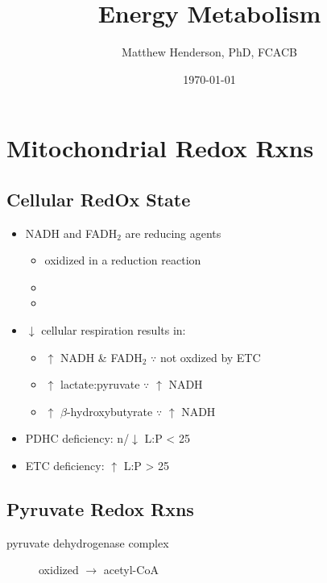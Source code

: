 \documentclass{scrartcl}
\author{Matthew Henderson, PhD, FCACB}
\date{\today}
\title{Energy Metabolism}
\begin{document}
\maketitle
\tableofcontents


\section{Mitochondrial Redox Rxns}
\label{sec:org5dca793}
\subsection{Cellular RedOx State}
\label{sec:org31262b0}
\begin{itemize}
\item NADH and FADH\(_{\text{2}}\) are reducing agents
\begin{itemize}
\item oxidized in a reduction reaction
\item {}
\item {}
\end{itemize}
\item \(\downarrow\) cellular respiration results in:
\begin{itemize}
\item \(\uparrow\) NADH \& FADH\(_{\text{2}}\) \(\because\) not oxdized by ETC
\item \(\uparrow\) lactate:pyruvate \(\because\) \(\uparrow\) NADH
\item \(\uparrow\) \(\beta\)-hydroxybutyrate  \(\because\) \(\uparrow\) NADH
\end{itemize}

\item PDHC deficiency: n/\(\downarrow\) L:P < 25
\item ETC deficiency: \(\uparrow\) L:P > 25
\end{itemize}

\subsection{Pyruvate Redox Rxns}
\label{sec:org52d4d7e}
\begin{description}
\item[{pyruvate dehydrogenase complex}] oxidized \(\to\) acetyl-CoA
\end{description}

\end{document}
